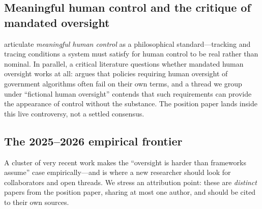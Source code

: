 \documentclass[11pt]{article}
\begin{document}
\subsection{Meaningful human control and the critique of mandated oversight}

\citet{santonidesio2018} articulate \emph{meaningful human control} as a philosophical
standard---tracking and tracing conditions a system must satisfy for human control to be
real rather than nominal. In parallel, a critical literature questions whether mandated
human oversight works at all: \citet{green2022} argues that policies requiring human
oversight of government algorithms often fail on their own terms, and a thread we group
under ``fictional human oversight'' \citep{fictionaloversight2024} contends that such
requirements can provide the appearance of control without the substance. The position
paper lands inside this live controversy, not a settled consensus.

\subsection{The 2025--2026 empirical frontier}

A cluster of very recent work makes the ``oversight is harder than frameworks assume'' case
empirically---and is where a new researcher should look for collaborators and open threads.
We stress an attribution point: these are \emph{distinct} papers from the position paper,
sharing at most one author, and should be cited to their own sources.
\end{document}
